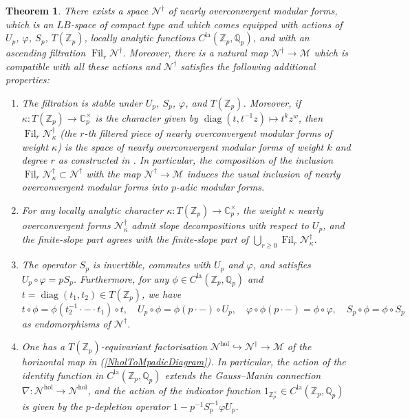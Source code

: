 \documentclass[10pt, oneside]{amsart}
\numberwithin{equation}{subsection}
\newcounter{alphalabels}
\newtheorem{theoremx}[alphalabels]{Theorem}
\theoremstyle{definition}
\theoremstyle{remark}
\newcommand{\mbb}[1]{\mathbb{#1}}
\newcommand{\opn}[1]{\operatorname{#1}}
\def\Q{\mathbb{Q}}
\def\Z{{\mathbb{Z}}}
\def\C{{\mathbb{C}}}
\begin{document}
\begin{theoremx} \label{TheoIntro1}
There exists a space $\mathscr{N}^{\dagger}$ of nearly overconvergent modular forms, which is an $LB$-space of compact type and which comes equipped with actions of $U_p$, $\varphi$, $S_p$, $T(\Z_p)$, locally analytic functions $C^{\opn{la}}(\Z_p, \Q_p)$, and with an ascending filtration $\opn{Fil}_r \mathscr{N}^{\dagger}$. Moreover, there is a natural map $\mathscr{N}^{\dagger} \to \mathscr{M}$ which is compatible with all these actions and $\mathscr{N}^{\dagger}$ satisfies the following additional properties:
\begin{enumerate}
\item The filtration is stable under $U_p$, $S_p$, $\varphi$, and $T(\Z_p)$. Moreover, if $\kappa \colon T(\Z_p) \rightarrow \C_p^\times$ is the character given by $\opn{diag}(t, t^{-1}z) \mapsto t^{k} z^w$, then $\opn{Fil}_r \mathscr{N}^\dagger_\kappa$ (the $r$-th filtered piece of nearly overconvergent modular forms of weight $\kappa$) is the space of nearly overconvergent modular forms of weight $k$ and degree $r$ as constructed in \cite{Urban}. In particular, the composition of the inclusion $\opn{Fil}_r\mathscr{N}^{\dagger}_{\kappa} \subset \mathscr{N}^{\dagger}$ with the map $\mathscr{N}^\dagger \to \mathscr{M}$ induces the usual inclusion of nearly overconvergent modular forms into $p$-adic modular forms.

\item For any locally analytic character $\kappa \colon T(\Z_p) \rightarrow \C_p^\times$, the weight $\kappa$ nearly overconvergent forms $\mathscr{N}^{\dagger}_{\kappa}$ admit slope decompositions with respect to $U_p$, and the finite-slope part agrees with the finite-slope part of $\bigcup_{r \geq 0} \opn{Fil}_r\mathscr{N}^{\dagger}_{\kappa}$. 

\item The operator $S_p$ is invertible, commutes with $U_p$ and $\varphi$, and satisfies $U_p \circ \varphi = p S_p$. Furthermore, for any $\phi \in C^{\opn{la}}(\mbb{Z}_p, \mbb{Q}_p)$ and $t = \opn{diag}(t_1, t_2) \in T(\mbb{Z}_p)$, we have
\[
t \circ \phi = \phi(t_2^{-1} \cdot - \cdot t_1) \circ t, \quad U_p \circ \phi = \phi(p \cdot -) \circ U_p, \quad \varphi \circ \phi(p \cdot -) = \phi \circ \varphi, \quad S_p \circ \phi = \phi \circ S_p
\]
as endomorphisms of $\mathscr{N}^{\dagger}$.

\item One has a $T(\mbb{Z}_p)$-equivariant factorisation $\mathscr{N}^{\opn{hol}} \hookrightarrow \mathscr{N}^{\dagger} \to \mathscr{M}$ of the horizontal map in (\ref{NholToMpadicDiagram}). In particular, the action of the identity function in $C^{\opn{la}}(\mbb{Z}_p, \mbb{Q}_p)$ extends the Gauss--Manin connection $\nabla \colon \mathscr{N}^{\opn{hol}} \to \mathscr{N}^{\opn{hol}}$, and the action of the indicator function $1_{\mbb{Z}_p^{\times}} \in C^{\opn{la}}(\mbb{Z}_p, \mbb{Q}_p)$ is given by the $p$-depletion operator $1 - p^{-1}S_p^{-1} \varphi U_p$.
\end{enumerate}
\end{theoremx}
\end{document}
